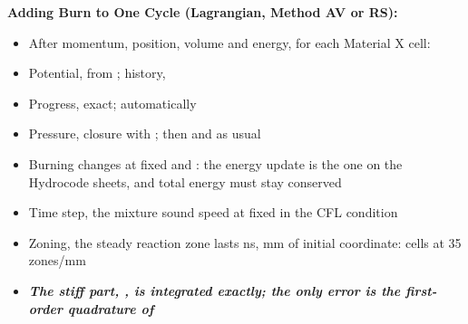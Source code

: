 \documentclass[11pt,addpoints]{exam}
\begin{document}
\begin{tcolorbox}[breakable]
\textbf{Adding Burn to One Cycle (Lagrangian, Method AV or RS):}\vspace{.5em}
\begin{itemize}
\item After momentum, position, volume and energy, for each Material X cell:\vspace{.5em}
\item Potential, \hspace{3mm}  from ; \hspace{5mm} history, \hspace{3mm} \vspace{.5em}
\item Progress, \hspace{3mm}  \hspace{5mm} exact;  automatically\vspace{.5em}
\item Pressure, \hspace{3mm} closure with ; \hspace{2mm} then  and  as usual\vspace{.5em}
\item Burning changes \bm{$\lambda$} at fixed \bm{$\rho$} and : \hspace{2mm} the energy update is the one on the Hydrocode sheets, and total energy must stay conserved\vspace{.5em}
\item Time step, \hspace{3mm} the mixture sound speed at fixed \bm{$\lambda$} in the CFL condition\vspace{.5em}
\item Zoning, \hspace{3mm} the steady reaction zone lasts  ns,  mm of initial coordinate: \hspace{2mm}  cells at 35 zones/mm\vspace{.5em}
\item \textbf{\emph{The stiff part, , is integrated exactly; the only error is the first-order quadrature of \bm{$\Phi$}}}
\end{itemize}
\end{tcolorbox}
\end{document}
